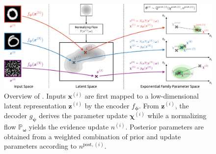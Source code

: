 \begin{figure}[t]
    \centering
    \includegraphics[width=.85\linewidth]{sections/007_iclr2022/resources/npn-crop.pdf}
    \caption{Overview of \NatPN{}. Inputs $\bm{x}^{(i)}$ are first mapped to a low-dimensional latent representation $\bm{z}^{(i)}$ by the encoder $f_{\bm{\phi}}$. From $\bm{z}^{(i)}$, the decoder $g_{\bm{\psi}}$ derives the parameter update $\bm{\chi}^{(i)}$ while a normalizing flow $\mathbb{P}_{\bm{\omega}}$ yields the evidence update $n^{(i)}$. Posterior parameters are obtained from a weighted combination of prior and update parameters according to $n^{\text{post},(i)}$.}
    \label{fig:npn}
\end{figure}

